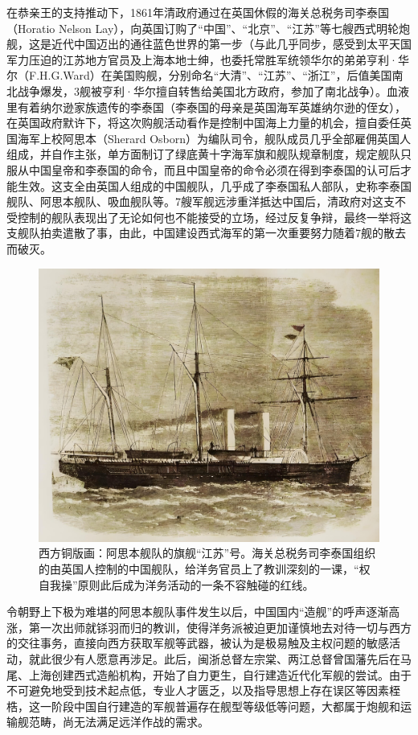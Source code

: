 \documentclass[12pt,UTF8]{ctexbook}
\begin{document}
在恭亲王的支持推动下，1861年清政府通过在英国休假的海关总税务司李泰国（Horatio Nelson Lay），向英国订购了“中国”、“北京”、“江苏”等七艘西式明轮炮舰，这是近代中国迈出的通往蓝色世界的第一步（与此几乎同步，感受到太平天国军力压迫的江苏地方官员及上海本地士绅，也委托常胜军统领华尔的弟弟亨利·华尔（F.H.G.Ward）在美国购舰，分别命名“大清”、“江苏”、“浙江”，后值美国南北战争爆发，3舰被亨利·华尔擅自转售给美国北方政府，参加了南北战争）。血液里有着纳尔逊家族遗传的李泰国（李泰国的母亲是英国海军英雄纳尔逊的侄女），在英国政府默许下，将这次购舰活动看作是控制中国海上力量的机会，擅自委任英国海军上校阿思本（Sherard Osborn）为编队司令，舰队成员几乎全部雇佣英国人组成，并自作主张，单方面制订了绿底黄十字海军旗和舰队规章制度，规定舰队只服从中国皇帝和李泰国的命令，而且中国皇帝的命令必须在得到李泰国的认可后才能生效。这支全由英国人组成的中国舰队，几乎成了李泰国私人部队，史称李泰国舰队、阿思本舰队、吸血舰队等。7艘军舰远涉重洋抵达中国后，清政府对这支不受控制的舰队表现出了无论如何也不能接受的立场，经过反复争辩，最终一举将这支舰队拍卖遣散了事，由此，中国建设西式海军的第一次重要努力随着7舰的散去而破灭。

\begin{figure}[htbp]
\centering
\includegraphics[width=1\linewidth]{Images/2}
\caption{西方铜版画：阿思本舰队的旗舰“江苏”号。海关总税务司李泰国组织的由英国人控制的中国舰队，给洋务官员上了教训深刻的一课，“权自我操”原则此后成为洋务活动的一条不容触碰的红线。}
\label{fig:1}
\end{figure}

令朝野上下极为难堪的阿思本舰队事件发生以后，中国国内“造舰”的呼声逐渐高涨，第一次出师就铩羽而归的教训，使得洋务派被迫更加谨慎地去对待一切与西方的交往事务，直接向西方获取军舰等武器，被认为是极易触及主权问题的敏感活动，就此很少有人愿意再涉足。此后，闽浙总督左宗棠、两江总督曾国藩先后在马尾、上海创建西式造船机构，开始了自力更生，自行建造近代化军舰的尝试。由于不可避免地受到技术起点低，专业人才匮乏，以及指导思想上存在误区等因素桎梏，这一阶段中国自行建造的军舰普遍存在舰型等级低等问题，大都属于炮舰和运输舰范畴，尚无法满足远洋作战的需求。
\end{document}
